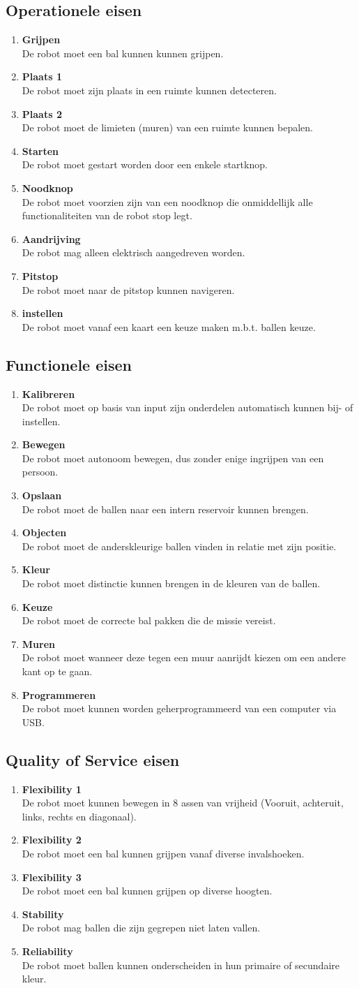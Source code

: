 \documentclass[12pt]{article} %
\begin{document}
\subsection{Operationele eisen}

\newcommand\litem[1]{\item{\bfseries #1\\}}
\begin{enumerate}
\litem{Grijpen} De robot moet een bal kunnen kunnen grijpen.
\litem{Plaats 1} De robot moet zijn plaats in een ruimte kunnen detecteren.
\litem{Plaats 2} De robot moet de limieten (muren) van een ruimte kunnen bepalen.
\litem{Starten} De robot moet gestart worden door een enkele startknop.
\litem{Noodknop} De robot moet voorzien zijn van een noodknop die onmiddellijk alle functionaliteiten van de robot stop legt.
\litem{Aandrijving} De robot mag alleen elektrisch aangedreven worden.
\litem{Pitstop} De robot moet naar de pitstop kunnen navigeren.
\litem{instellen} De robot moet vanaf een kaart een keuze maken m.b.t. ballen keuze.
\end{enumerate}

\subsection{Functionele eisen}
\begin{enumerate}
\litem{Kalibreren} De robot moet op basis van input zijn onderdelen automatisch kunnen bij- of instellen.
\litem{Bewegen} De robot moet autonoom bewegen, dus zonder enige ingrijpen van een persoon.
\litem{Opslaan} De robot moet de ballen naar een intern reservoir kunnen brengen.
\litem{Objecten} De robot moet de anderskleurige ballen vinden in relatie met zijn positie.
\litem{Kleur} De robot moet distinctie kunnen brengen in de kleuren van de ballen. 
\litem{Keuze} De robot moet de correcte bal pakken die de missie vereist.
\litem{Muren} De robot moet wanneer deze tegen een muur aanrijdt kiezen om een andere kant op te gaan.
\litem{Programmeren} De robot moet kunnen worden geherprogrammeerd van een computer via USB.  
\end{enumerate}
\newpage

\subsection{Quality of Service eisen}
\begin{enumerate}
\litem{Flexibility 1} De robot moet kunnen bewegen in 8 assen van vrijheid (Vooruit, achteruit, links, rechts en diagonaal).
\litem{Flexibility 2} De robot moet een bal kunnen grijpen vanaf diverse invalshoeken.
\litem{Flexibility 3} De robot moet een bal kunnen grijpen op diverse hoogten.
\litem{Stability} De robot mag ballen die zijn gegrepen niet laten vallen.
\litem{Reliability} De robot moet ballen kunnen onderscheiden in hun primaire of secundaire kleur.
\end{enumerate}
\end{document}
